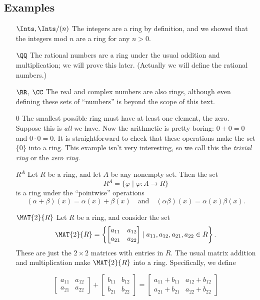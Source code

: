 \documentclass{article}
\begin{document}
\subsection*{Examples}

\begin{itemize}
\item[$\Ints, \Ints/(n)$] The integers are a ring by definition, and we showed that the integers mod $n$ are a ring for any $n > 0$.

\item[$\QQ$] The rational numbers are a ring under the usual addition and multiplication; we will prove this later. (Actually we will define the rational numbers.)

\item[$\RR$, $\CC$] The real and complex numbers are also rings, although even defining these sets of ``numbers'' is beyond the scope of this text.

\item[$0$] The smallest possible ring must have at least one element, the zero. Suppose this is \emph{all} we have. Now the arithmetic is pretty boring: $0+0 = 0$ and $0 \cdot 0 = 0$. It is straightforward to check that these operations make the set $\{0\}$ into a ring. This example isn't very interesting, so we call this the \emph{trivial ring} or the \emph{zero ring}.

\item[$R^A$] Let $R$ be a ring, and let $A$ be any nonempty set. Then the set \[ R^A = \{ \varphi \mid \varphi : A \rightarrow R \} \] is a ring under the ``pointwise'' operations \[ (\alpha + \beta)(x) = \alpha(x) + \beta(x) \quad \mathrm{and} \quad (\alpha\beta)(x) = \alpha(x) \beta(x). \]

\item[$\MAT{2}{R}$] Let $R$ be a ring, and consider the set \[ \MAT{2}{R} = \left\{ \begin{bmatrix} a_{11} & a_{12} \\ a_{21} & a_{22} \end{bmatrix} \mid a_{11}, a_{12}, a_{21}, a_{22} \in R \right\}. \] These are just the $2 \times 2$ matrices with entries in $R$. The usual matrix addition and multiplication make $\MAT{2}{R}$ into a ring. Specifically, we define

\[\begin{bmatrix} a_{11} & a_{12} \\ a_{21} & a_{22} \end{bmatrix} + \begin{bmatrix} b_{11} & b_{12} \\ b_{21} & b_{22} \end{bmatrix} = \begin{bmatrix} a_{11} + b_{11} & a_{12} + b_{12} \\ a_{21} + b_{21} & a_{22} + b_{22} \end{bmatrix}\]


\end{itemize}
\end{document}
